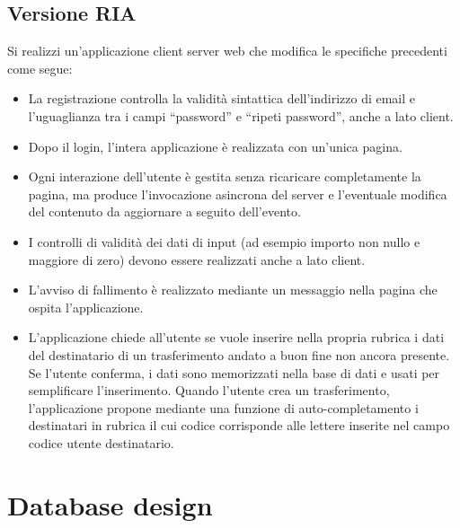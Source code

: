 \documentclass{article}
\begin{document}
	\subsection{Versione RIA}
		Si realizzi un’applicazione client server web che modifica le specifiche precedenti come segue:
		\begin{itemize}
		\item La registrazione controlla la validità sintattica dell’indirizzo di email e l’uguaglianza tra
		i campi “password” e “ripeti password”, anche a lato client.
		\item Dopo il login, l’intera applicazione è realizzata con un’unica pagina.
		\item 	Ogni interazione dell’utente è gestita senza ricaricare completamente la pagina, ma
		produce l’invocazione asincrona del server e l’eventuale modifica del contenuto da
		aggiornare a seguito dell’evento.
		\item I controlli di validità dei dati di input (ad esempio importo non nullo e maggiore di zero)
		devono essere realizzati anche a lato client.
		\item L’avviso di fallimento è realizzato mediante un messaggio nella pagina che ospita
		l’applicazione.
		\item L’applicazione chiede all’utente se vuole inserire nella propria rubrica i dati del
		destinatario di un trasferimento andato a buon fine non ancora presente. Se l’utente
		conferma, i dati sono memorizzati nella base di dati e usati per semplificare
		l’inserimento. Quando l’utente crea un trasferimento, l’applicazione propone mediante
		una funzione di auto-completamento i destinatari in rubrica il cui codice corrisponde
		alle lettere inserite nel campo codice utente destinatario.
		\end{itemize}
	
	\pagebreak
	\section{Database design}
	
\end{document}
